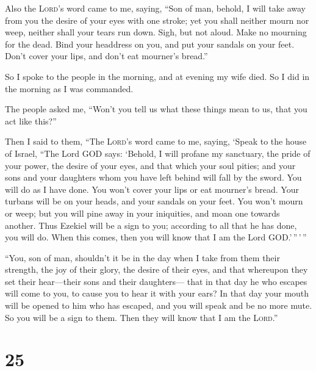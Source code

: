  Also the \textsc{Lord}'s word came to me, saying,
 ``Son of man, behold, I will take away from you the
desire of your eyes with one stroke; yet you shall neither mourn nor
weep, neither shall your tears run down.  Sigh, but not
aloud. Make no mourning for the dead. Bind your headdress on you, and
put your sandals on your feet. Don't cover your lips, and don't eat
mourner's bread.''

 So I spoke to the people in the morning, and at evening
my wife died. So I did in the morning as I was commanded.

 The people asked me, ``Won't you tell us what these
things mean to us, that you act like this?''

 Then I said to them, ``The \textsc{Lord}'s word came to
me, saying,  `Speak to the house of Israel, ``The Lord
GOD says: `Behold, I will profane my sanctuary, the pride of your power,
the desire of your eyes, and that which your soul pities; and your sons
and your daughters whom you have left behind will fall by the sword.
 You will do as I have done. You won't cover your lips or
eat mourner's bread.  Your turbans will be on your heads,
and your sandals on your feet. You won't mourn or weep; but you will
pine away in your iniquities, and moan one towards another.
 Thus Ezekiel will be a sign to you; according to all
that he has done, you will do. When this comes, then you will know that
I am the Lord GOD.'\,''\,'\,''

 ``You, son of man, shouldn't it be in the day when I
take from them their strength, the joy of their glory, the desire of
their eyes, and that whereupon they set their hear---their sons and
their daughters---  that in that day he who escapes will
come to you, to cause you to hear it with your ears?  In
that day your mouth will be opened to him who has escaped, and you will
speak and be no more mute. So you will be a sign to them. Then they will
know that I am the \textsc{Lord}.''

\hypertarget{section-24}{%
\section{25}\label{section-24}}

